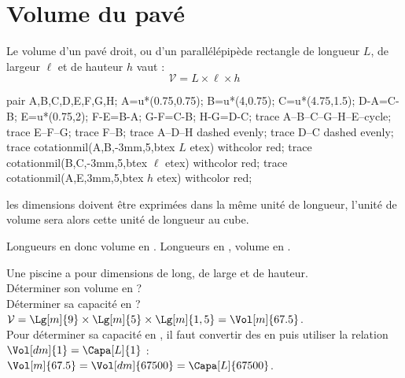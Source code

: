 \section{Volume du pavé}
\begin{changemargin}{0mm}{-20mm}
    \begin{propriete}
        \begin{minipage}{0.55\linewidth}
        Le volume d'un pavé droit, ou d'un parallélépipède rectangle de longueur $L$, de largeur $\ell$ et de hauteur $h$ vaut :
        $${\mathcal V}=L\times \ell\times h$$
        \end{minipage}
        \hfill
        \begin{minipage}{0.4\linewidth}
        \begin{center}
            \begin{Geometrie}[CoinBG={(0,-0.5u)},CoinHD={(6u,4.5u)}]
                pair A,B,C,D,E,F,G,H;
                A=u*(0.75,0.75);
                B=u*(4,0.75);
                C=u*(4.75,1.5);
                D-A=C-B;
                E=u*(0.75,2);
                F-E=B-A;
                G-F=C-B;
                H-G=D-C;
                trace A--B--C--G--H--E--cycle;
                trace E--F--G;
                trace F--B;
                trace A--D--H dashed evenly;
                trace D--C dashed evenly;
                trace cotationmil(A,B,-3mm,5,btex $L$ etex) withcolor red;
                trace cotationmil(B,C,-3mm,5,btex $\ell$ etex) withcolor red;
                trace cotationmil(A,E,3mm,5,btex $h$ etex) withcolor red;
            \end{Geometrie}
        \end{center}
    \end{minipage}
    \end{propriete}
\end{changemargin}


\begin{remarque}
   les dimensions doivent être exprimées dans la même unité de longueur, l'unité de volume sera alors cette unité de longueur au cube.
   \par
   Longueurs en \Lg[cm]{} donc volume en \Vol[cm]{}. Longueurs en \Lg[mm]{}, volume en \Vol[mm]{}.
\end{remarque}

\begin{changemargin}{0mm}{-15mm}
    \begin{exemple}
    Une piscine a pour dimensions  de long,  de large et  de hauteur. \\
    Déterminer son volume en \Vol[m]{} ? \\
    Déterminer sa capacité en \Capa[L]{} ?
    \correction
        $\mathcal{V} =\Lg[m]{9}\times\Lg[m]{5}\times\Lg[m]{1,5} =\Vol[m]{67.5}$. \\
        Pour déterminer sa capacité en \Capa[L]{}, il faut convertir des \Vol[m]{} en \Vol[dm]{} puis utiliser la relation $\Vol[dm]{1} =\Capa[L]{1}$ : \\
        $\Vol[m]{67.5} =\Vol[dm]{67500} =\Capa[L]{67500}$.
    \end{exemple}
\end{changemargin}